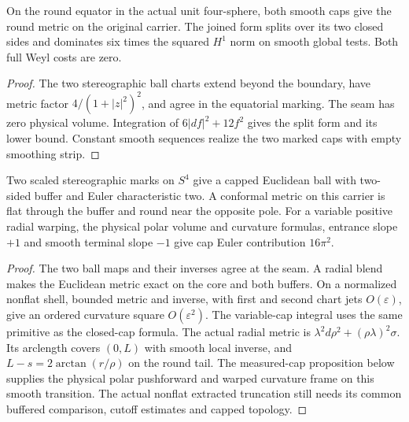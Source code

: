 \begin{proposition}
\label{prop:ed53-geometric-cap}
\leanok
On the round equator in the actual unit four-sphere, both smooth
caps give the round metric on the original carrier. The joined form
splits over its two closed sides and dominates six times the squared
$H^1$ norm on smooth global tests. Both full Weyl costs are zero.
\end{proposition}
\begin{proof}
\leanok
The two stereographic ball charts extend beyond the boundary, have
metric factor $4/(1+|z|^2)^2$, and agree in the equatorial marking.
The seam has zero physical volume. Integration of
$6|df|^2+12 f^2$ gives the split form and its lower bound. Constant
smooth sequences realize the two marked caps with empty smoothing strip.
\end{proof}

\begin{proposition}
\label{prop:ed53-buffered}
\leanok
Two scaled stereographic marks on $S^4$ give a capped Euclidean
ball with two-sided buffer and Euler characteristic two. A conformal
metric on this carrier is flat through the buffer and round near
the opposite pole. For a variable positive radial warping, the
physical polar volume and curvature formulas, entrance slope $+1$
and smooth terminal slope $-1$ give cap Euler contribution $16\pi^2$.
\end{proposition}
\begin{proof}
\leanok
The two ball maps and their inverses agree at the seam. A radial blend
makes the Euclidean metric exact on the core and both buffers. On
a normalized nonflat shell, bounded metric and inverse, with first
and second chart jets $O(\varepsilon)$, give an ordered curvature
square $O(\varepsilon^2)$. The variable-cap integral uses the same
primitive as the closed-cap formula. The actual radial metric is
$\lambda^2d\rho^2+(\rho\lambda)^2\sigma$. Its arclength covers $(0,L)$
with smooth local inverse, and $L-s=2\arctan(r/\rho)$ on the round tail.
The measured-cap proposition below supplies the physical polar pushforward
and warped curvature frame on this smooth transition. The actual nonflat extracted truncation still needs its common
buffered comparison, cutoff estimates and capped topology.
\end{proof}

